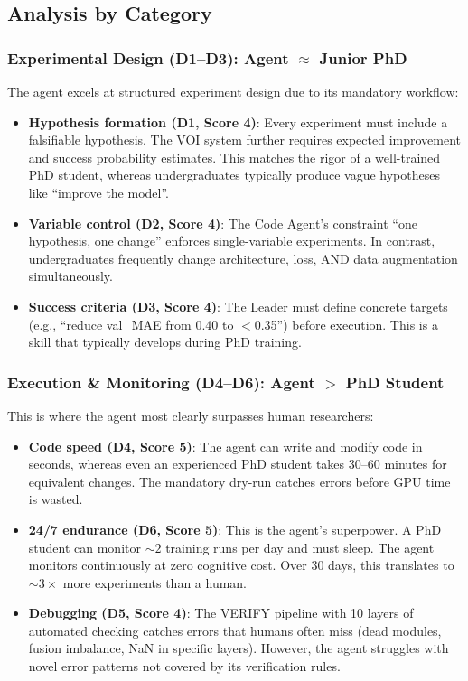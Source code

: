 \documentclass[11pt,a4paper]{article}
\begin{document}
\subsection{Analysis by Category}

\subsubsection{Experimental Design (D1--D3): Agent $\approx$ Junior PhD}

The agent excels at structured experiment design due to its mandatory workflow:
\begin{itemize}[nosep]
\item \textbf{Hypothesis formation (D1, Score 4)}: Every experiment must include a falsifiable hypothesis.
The VOI system further requires expected improvement and success probability estimates.
This matches the rigor of a well-trained PhD student, whereas undergraduates typically produce vague hypotheses like ``improve the model''.

\item \textbf{Variable control (D2, Score 4)}: The Code Agent's constraint ``one hypothesis, one change'' enforces single-variable experiments.
In contrast, undergraduates frequently change architecture, loss, AND data augmentation simultaneously.

\item \textbf{Success criteria (D3, Score 4)}: The Leader must define concrete targets (e.g., ``reduce val\_MAE from 0.40 to $<$0.35'') before execution.
This is a skill that typically develops during PhD training.
\end{itemize}

\subsubsection{Execution \& Monitoring (D4--D6): Agent $>$ PhD Student}

This is where the agent most clearly surpasses human researchers:

\begin{itemize}[nosep]
\item \textbf{Code speed (D4, Score 5)}: The agent can write and modify code in seconds, whereas even an experienced PhD student takes 30--60 minutes for equivalent changes.
The mandatory dry-run catches errors before GPU time is wasted.

\item \textbf{24/7 endurance (D6, Score 5)}: This is the agent's superpower.
A PhD student can monitor ${\sim}2$ training runs per day and must sleep.
The agent monitors continuously at zero cognitive cost.
Over 30 days, this translates to ${\sim}3\times$ more experiments than a human.

\item \textbf{Debugging (D5, Score 4)}: The VERIFY pipeline with 10 layers of automated checking catches errors that humans often miss (dead modules, fusion imbalance, NaN in specific layers).
However, the agent struggles with novel error patterns not covered by its verification rules.
\end{itemize}
\end{document}

